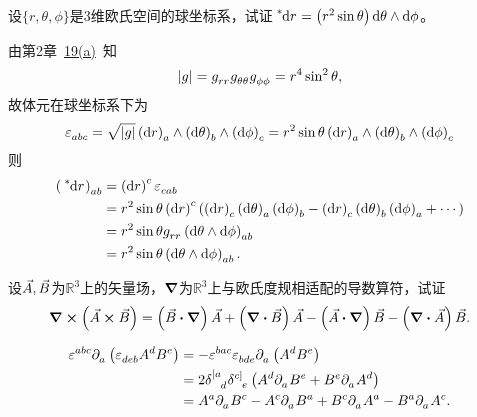 \begin{xiti}
	\item 设$\{r,\theta, \phi \} $是3维欧氏空间的球坐标系，试证$\tensor[^*]{\dd{r}}{} = \left(r^2 \sin\theta \right) \dd{\theta} \wedge \dd{\phi} $。

	\begin{zm}
		由第2章~\hyperlink{2.19a}{19(a)}~知
		\begin{displaymath}
		\abs{g} = \tensor{g}{_r_r} \tensor{g}{_{\theta\theta}} \tensor{g}{_\phi_\phi} = r^4 \sin^2 \theta,
		\end{displaymath}
		故体元在球坐标系下为
		\begin{displaymath}
		\tensor{\varepsilon}{_a_b_c} = \sqrt{\abs{g}} \tensor{\left(\dd{r}\right)}{_a} \wedge \tensor{\left(\dd{\theta}\right)}{_b} \wedge \tensor{\left(\dd{\phi}\right)}{_c} = r^2 \sin\theta \tensor{\left(\dd{r}\right)}{_a} \wedge \tensor{\left(\dd{\theta}\right)}{_b} \wedge \tensor{\left(\dd{\phi}\right)}{_c}
		\end{displaymath}
		则
		\begin{align*}
		\tensor{\left(\tensor[^*]{\dd{r}}{}\right)}{_a_b} &= \tensor{\left(\dd{r}\right)}{^c} \tensor{\varepsilon}{_c_a_b}\\
		&= r^2 \sin\theta \tensor{\left(\dd{r}\right)}{^c} \left( \tensor{\left(\dd{r}\right)}{_c} \tensor{\left(\dd{\theta}\right)}{_a} \tensor{\left(\dd{\phi}\right)}{_b} - \tensor{\left(\dd{r}\right)}{_c} \tensor{\left(\dd{\theta}\right)}{_b} \tensor{\left(\dd{\phi}\right)}{_a} + \cdots \right)\\
		&= r^2 \sin\theta \tensor{g}{_r_r} \tensor{\left(\dd{\theta}\wedge\dd{\phi}\right)}{_a_b}\\
		&= r^2 \sin\theta \tensor{\left(\dd{\theta}\wedge\dd{\phi}\right)}{_a_b}.
		\end{align*}
	\end{zm}

	\item 设$\vec{A},\vec{B} $为$\mathbb{R}^3 $上的矢量场，$\grad $为$\mathbb{R}^3$上与欧氏度规相适配的导数算符，试证\[ \curl(\myvec{A}\cp\myvec{B}) = \left( \myvec{B} \vdot \grad \right) \myvec{A} + \left( \div{\myvec{B}} \right) \myvec{A} - \left( \myvec{A} \vdot \grad \right) \myvec{B} - \left( \div{\myvec{A}} \right) \myvec{B}. \]

	\begin{zm}
		\begin{align*}
		\tensor{\varepsilon}{^a^b^c} \Partial{a} \left( \tensor{\varepsilon}{_d_e_b} \tensor{A}{^d} \tensor{B}{^e} \right) &= -\tensor{\varepsilon}{^b^a^c} \tensor{\varepsilon}{_b_d_e} \Partial{a} \left(  \tensor{A}{^d} \tensor{B}{^e} \right)\\
		&= 2 \tensor{\delta}{^{[a}_d} \tensor{\delta}{^{c]}_e} \left( \tensor{A}{^d} \Partial{a} \tensor{B}{^e} + \tensor{B}{^e} \Partial{a} \tensor{A}{^d} \right)\\
		&= \tensor{A}{^a} \Partial{a} \tensor{B}{^c} - \tensor{A}{^c} \Partial{a} \tensor{B}{^a} + \tensor{B}{^c} \Partial{a} \tensor{A}{^a} - \tensor{B}{^a} \Partial{a} \tensor{A}{^c}.
		\end{align*}
	\end{zm}


\end{xiti}
